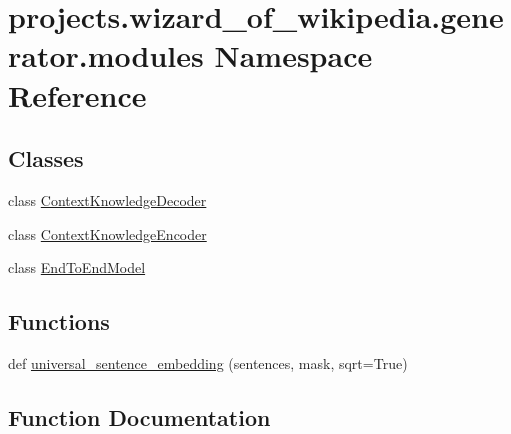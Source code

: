 \hypertarget{namespaceprojects_1_1wizard__of__wikipedia_1_1generator_1_1modules}{}\section{projects.\+wizard\+\_\+of\+\_\+wikipedia.\+generator.\+modules Namespace Reference}
\label{namespaceprojects_1_1wizard__of__wikipedia_1_1generator_1_1modules}
\subsection*{Classes}
\begin{DoxyCompactItemize}
\item 
class \hyperlink{classprojects_1_1wizard__of__wikipedia_1_1generator_1_1modules_1_1ContextKnowledgeDecoder}{Context\+Knowledge\+Decoder}
\item 
class \hyperlink{classprojects_1_1wizard__of__wikipedia_1_1generator_1_1modules_1_1ContextKnowledgeEncoder}{Context\+Knowledge\+Encoder}
\item 
class \hyperlink{classprojects_1_1wizard__of__wikipedia_1_1generator_1_1modules_1_1EndToEndModel}{End\+To\+End\+Model}
\end{DoxyCompactItemize}
\subsection*{Functions}
\begin{DoxyCompactItemize}
\item 
def \hyperlink{namespaceprojects_1_1wizard__of__wikipedia_1_1generator_1_1modules_aa0e28a2592caa75f5c687c6200d2a68d}{universal\+\_\+sentence\+\_\+embedding} (sentences, mask, sqrt=True)
\end{DoxyCompactItemize}


\subsection{Function Documentation}
\mbox{\label{namespaceprojects_1_1wizard__of__wikipedia_1_1generator_1_1modules_aa0e28a2592caa75f5c687c6200d2a68d}} 
